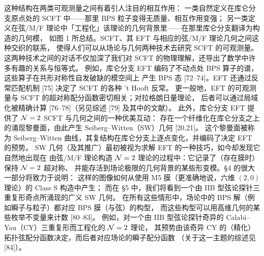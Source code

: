 这种结构在两类可观测量之间有着引人注目的相互作用：
一类自然定义在库仑分支原点处的 SCFT 中——那里 BPS 粒子变得无质量、相互作用变强；
另一类定义在弦/M/F 理论中「工程化」该理论的几何背景里——在那里库仑分支翻译为构造的几何模，
如图 1 所总结。SCFT、其 EFT 与相应的弦/M/F 理论几何之间这种交织的联系，
使得人们可以从场论与几何两种技术去研究 SCFT 的可观测量。
这两种技术之间的对话不仅加深了我们对 SCFT 的物理理解，还导出了数学中许多有趣的关系与恒等式。
例如，库仑分支 EFT 编码了不动点处 BPS 算子的谱，这些算子在共形对称性自发破缺的模空间上
产生 BPS 态 [72--74]。EFT 还通过反常匹配机制 [75] 决定了 SCFT 的各种 't Hooft 反常。
更一般地，EFT 的可观测量与 SCFT 的超对称配分函数密切相关；对拉格朗日量理论，
后者可以通过局域化被精确计算 [76--78]（另见综述 [79] 及其中的文献）。
此外，库仑分支 EFT 提供了 $\mathcal{N}=2$ SCFT 与几何之间的一种优美互动：
存在一个纤维化在库仑分支之上的涌现黎曼面，由此产生 Seiberg--Witten（SW）几何 [20,21]。
这个黎曼面被称为 Seiberg--Witten 曲线，其复结构在库仑分支上逐点变化，并编码了决定 EFT 的预势。
SW 几何（及其推广）最初被视为求解 EFT 的一种技巧，如今却发现它自然地出现在
由弦/M/F 理论构造 $\mathcal{N}=2$ 理论的过程中：它记录了（存在膜时）保持 $\mathcal{N}=2$ 超对称、
并能存活到场论极限的几何背景的某些形变模。§4 的很大一部分将致力于说明：
这样的图像如何从使用 M5 膜（更准确地说，六维 $(2,0)$ 理论）的 Class S 构造中产生；
而在 §5 中，我们将看到一个由 IIB 型弦论探针三重复形奇点所涌现的广义 SW 几何。
在所有这些情形中，场论中的 BPS 解（例如瞬子与粒子）都对应 BPS 膜（与弦）的构型，
而这些构型可以用高维几何的某些枚举不变量来计数 [80--83]。
例如，对一个由 IIB 型弦论探针奇异的 Calabi--Yau（CY）三重复形而工程化的 $\mathcal{N}=2$ 理论，
其预势由该奇异 CY 的（精化）拓扑弦配分函数决定，而后者对应场论的瞬子配分函数
（关于这一主题的综述见 [84]）。

